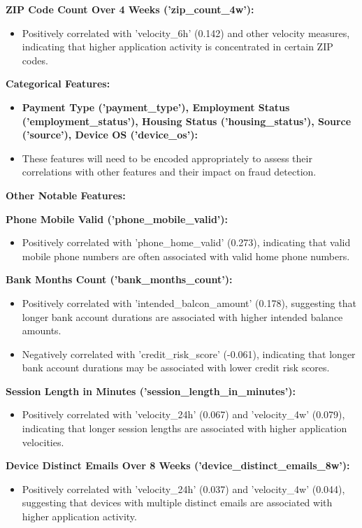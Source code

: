 \documentclass[12pt,a4paper]{report}
\begin{document}
\textbf{ZIP Code Count Over 4 Weeks ('zip\_count\_4w'):}
\begin{itemize}
    \item Positively correlated with 'velocity\_6h' (0.142) and other velocity measures, indicating that higher application activity is concentrated in certain ZIP codes.
\end{itemize}

\textbf{Categorical Features:}
\begin{itemize}
    \item \textbf{Payment Type ('payment\_type'), Employment Status ('employment\_status'), Housing Status ('housing\_status'), Source ('source'), Device OS ('device\_os'):}
    \item These features will need to be encoded appropriately to assess their correlations with other features and their impact on fraud detection.
\end{itemize}

\textbf{Other Notable Features:}

\textbf{Phone Mobile Valid ('phone\_mobile\_valid'):}
\begin{itemize}
    \item Positively correlated with 'phone\_home\_valid' (0.273), indicating that valid mobile phone numbers are often associated with valid home phone numbers.
\end{itemize}

\textbf{Bank Months Count ('bank\_months\_count'):}
\begin{itemize}
    \item Positively correlated with 'intended\_balcon\_amount' (0.178), suggesting that longer bank account durations are associated with higher intended balance amounts.
    \item Negatively correlated with 'credit\_risk\_score' (-0.061), indicating that longer bank account durations may be associated with lower credit risk scores.
\end{itemize}

\textbf{Session Length in Minutes ('session\_length\_in\_minutes'):}
\begin{itemize}
    \item Positively correlated with 'velocity\_24h' (0.067) and 'velocity\_4w' (0.079), indicating that longer session lengths are associated with higher application velocities.
\end{itemize}

\textbf{Device Distinct Emails Over 8 Weeks ('device\_distinct\_emails\_8w'):}
\begin{itemize}
    \item Positively correlated with 'velocity\_24h' (0.037) and 'velocity\_4w' (0.044), suggesting that devices with multiple distinct emails are associated with higher application activity.
\end{itemize}
\end{document}

